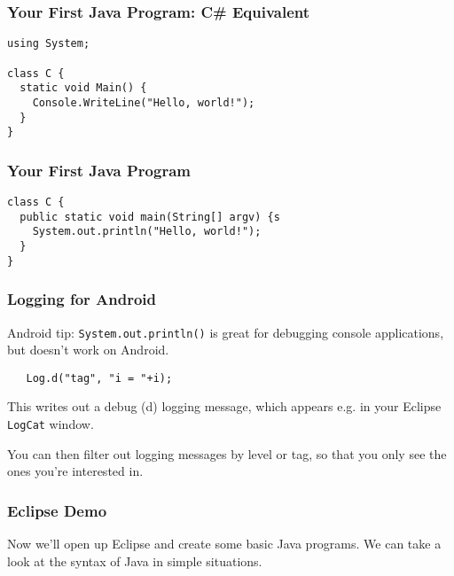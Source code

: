 \begin{frame}[fragile]
\frametitle{Your First Java Program: C\# Equivalent}
\begin{changemargin}{1cm}

\begin{verbatim}
using System;

class C {
  static void Main() {
    Console.WriteLine("Hello, world!");
  }
}
\end{verbatim}


\end{changemargin}
\end{frame}

\begin{frame}[fragile]
\frametitle{Your First Java Program}
\begin{changemargin}{1cm}

\begin{verbatim}
class C {
  public static void main(String[] argv) {s
    System.out.println("Hello, world!");
  }
}
\end{verbatim}


\end{changemargin}
\end{frame}


\begin{frame}
\frametitle{Logging for Android}
\begin{changemargin}{1cm}
Android tip: {\tt System.out.println()} is great
for debugging console applications, but doesn't work on Android.

{\tt ~~~Log.d("tag", "i = "+i); }

This writes out a debug (d) logging message, which appears e.g. in your Eclipse
{\tt LogCat} window.


You can then filter out logging messages
by level or tag, so that you only see the ones you're interested in.

\end{changemargin}
\end{frame}


\begin{frame}
\frametitle{Eclipse Demo}
\begin{changemargin}{1cm}

Now we'll open up Eclipse and create some basic Java programs. We can take a look at the syntax of Java in simple situations.


\end{changemargin}
\end{frame}






